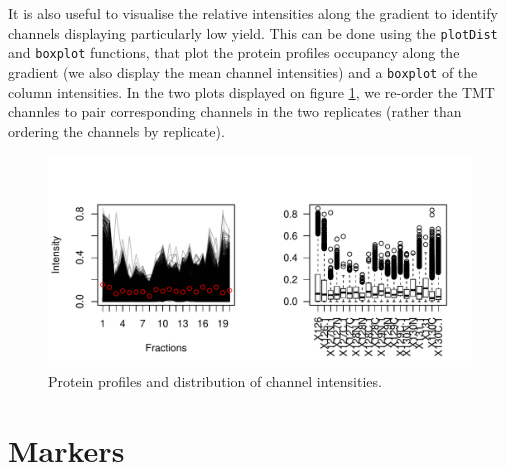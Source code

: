 It is also useful to visualise the relative intensities along the
gradient to identify channels displaying particularly low yield. This
can be done using the \texttt{plotDist} and \texttt{boxplot}
functions, that plot the protein profiles occupancy along the gradient
(we also display the mean channel intensities) and a \texttt{boxplot}
of the column intensities.  In the two plots displayed on figure
\ref{fig:qcbx}, we re-order the TMT channles to pair corresponding
channels in the two replicates (rather than ordering the channels by
replicate).

\begin{figure}[!ht]
  \centering
\begin{knitrout}
\color{fgcolor}\begin{kframe}
\begin{alltt}
\hlstd{(} \hlstd{=} \hlstd{(}\hlstd{,} \hlstd{))}
 \hlkwb{<-} \hlopt{$}
  \hlstd{=} \hlstd{)}
\hlstd{(}\hlstd{(}  \hlstd{=} \hlstd{,}  \hlstd{=} \hlstd{)}
\hlstd{(}  \hlstd{=} \hlstd{)}
\end{alltt}
\end{kframe}
\includegraphics[width=\textwidth]{figure/qcbx-1} 

\end{knitrout}
  \caption{Protein profiles and distribution of channel intensities.}
  \label{fig:qcbx}
\end{figure}


\section*{Markers}

